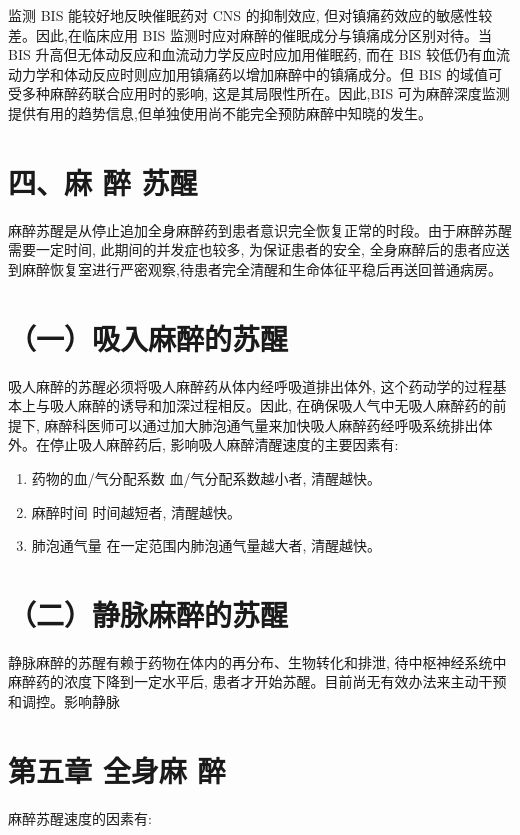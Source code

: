 \documentclass[10pt]{article}
\begin{document}
监测 BIS 能较好地反映催眠药对 CNS 的抑制效应, 但对镇痛药效应的敏感性较差。因此,在临床应用 BIS 监测时应对麻醉的催眠成分与镇痛成分区别对待。当 BIS 升高但无体动反应和血流动力学反应时应加用催眠药, 而在 BIS 较低仍有血流动力学和体动反应时则应加用镇痛药以增加麻醉中的镇痛成分。但 BIS 的域值可受多种麻醉药联合应用时的影响, 这是其局限性所在。因此,BIS 可为麻醉深度监测提供有用的趋势信息,但单独使用尚不能完全预防麻醉中知晓的发生。

\section*{四、麻 醉 苏醒}
麻醉苏醒是从停止追加全身麻醉药到患者意识完全恢复正常的时段。由于麻醉苏醒需要一定时间, 此期间的并发症也较多, 为保证患者的安全, 全身麻醉后的患者应送到麻醉恢复室进行严密观察,待患者完全清醒和生命体征平稳后再送回普通病房。

\section*{（一）吸入麻醉的苏醒}
吸人麻醉的苏醒必须将吸人麻醉药从体内经呼吸道排出体外, 这个药动学的过程基本上与吸人麻醉的诱导和加深过程相反。因此, 在确保吸人气中无吸人麻醉药的前提下, 麻醉科医师可以通过加大肺泡通气量来加快吸人麻醉药经呼吸系统排出体外。在停止吸人麻醉药后, 影响吸人麻醉清醒速度的主要因素有:

\begin{enumerate}
  \item 药物的血/气分配系数 血/气分配系数越小者, 清醒越快。

  \item 麻醉时间 时间越短者, 清醒越快。

  \item 肺泡通气量 在一定范围内肺泡通气量越大者, 清醒越快。

\end{enumerate}

\section*{（二）静脉麻醉的苏醒}
静脉麻醉的苏醒有赖于药物在体内的再分布、生物转化和排泄, 待中枢神经系统中麻醉药的浓度下降到一定水平后, 患者才开始苏醒。目前尚无有效办法来主动干预和调控。影响静脉

\section*{第五章 全身麻 醉}
麻醉苏醒速度的因素有:
\end{document}
